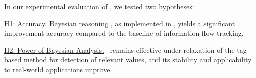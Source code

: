 In our experimental evaluation of \Tool, we tested two hypotheses:
\begin{compactenum}
\item \underline{H1: Accuracy.}
    Bayesian reasoning , as implemented in \Tool,
     yields a significant improvement  accuracy compared to the baseline of information-flow tracking.
\item {}
    {\underline{H2: Power of Bayesian Analysis.} \Tool\ remains effective under relaxation of the tag-based method for detection of relevant values, and its stability and applicability to real-world applications improve.}
\end{compactenum}








